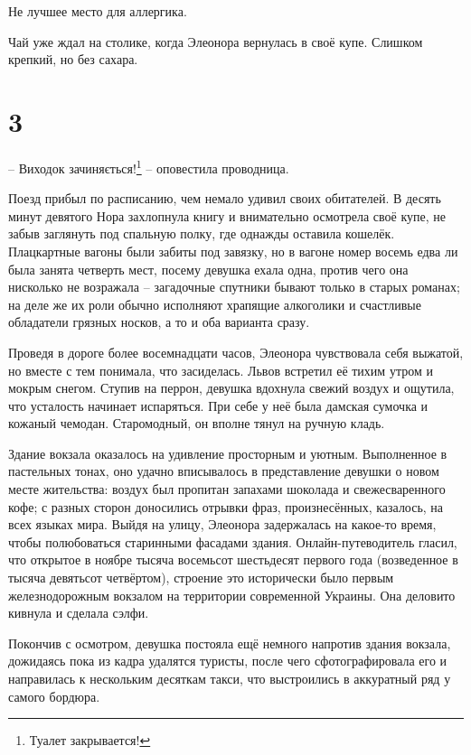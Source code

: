\documentclass[
  a5paperpaper,
  DIV=11,
  numbers=noendperiod]{scrreprt}
\begin{document}
Не лучшее место для аллергика.

Чай уже ждал на столике, когда Элеонора вернулась в своё купе. Слишком
крепкий, но без сахара.

\section*{3}\label{3}


-- Виходок зачиняється!\footnote{Туалет закрывается!} -- оповестила
проводница.

Поезд прибыл по расписанию, чем немало удивил своих обитателей. В десять
минут девятого Нора захлопнула книгу и внимательно осмотрела своё купе,
не забыв заглянуть под спальную полку, где однажды оставила кошелёк.
Плацкартные вагоны были забиты под завязку, но в вагоне номер восемь
едва ли была занята четверть мест, посему девушка ехала одна, против
чего она нисколько не возражала -- загадочные спутники бывают только в
старых романах; на деле же их роли обычно исполняют храпящие алкоголики
и счастливые обладатели грязных носков, а то и оба варианта сразу.

Проведя в дороге более восемнадцати часов, Элеонора чувствовала себя
выжатой, но вместе с тем понимала, что засиделась. Львов встретил её
тихим утром и мокрым снегом. Ступив на перрон, девушка вдохнула свежий
воздух и ощутила, что усталость начинает испаряться. При себе у неё была
дамская сумочка и кожаный чемодан. Старомодный, он вполне тянул на
ручную кладь.

Здание вокзала оказалось на удивление просторным и уютным. Выполненное в
пастельных тонах, оно удачно вписывалось в представление девушки о новом
месте жительства: воздух был пропитан запахами шоколада и
свежесваренного кофе; с разных сторон доносились отрывки фраз,
произнесённых, казалось, на всех языках мира. Выйдя на улицу, Элеонора
задержалась на какое-то время, чтобы полюбоваться старинными фасадами
здания. Онлайн-путеводитель гласил, что открытое в ноябре тысяча
восемьсот шестьдесят первого года (возведенное в тысяча девятьсот
четвёртом), строение это исторически было первым железнодорожным
вокзалом на территории современной Украины. Она деловито кивнула и
сделала сэлфи.

Покончив с осмотром, девушка постояла ещё немного напротив здания
вокзала, дожидаясь пока из кадра удалятся туристы, после чего
сфотографировала его и направилась к нескольким десяткам такси, что
выстроились в аккуратный ряд у самого бордюра.
\end{document}
